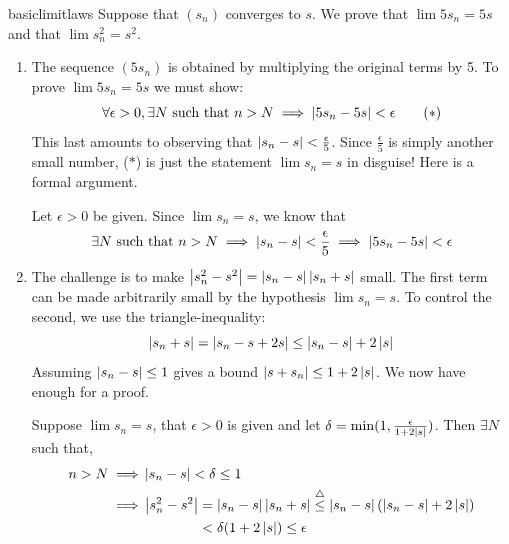 \begin{examples}{}{basiclimitlaws}
	Suppose that $(s_n)$ converges to $s$. We prove that $\lim 5s_n=5s$ and that $\lim s_n^2=s^2$.
	\begin{enumerate}
	  \item\label{ex:basiclimitlaws1} The sequence $(5s_n)$ is obtained by multiplying the original terms by 5. To prove $\lim 5s_n=5s$ we must show:
		\[
			\forall\epsilon>0, \exists N\text{ such that }n>N\implies \left| 5s_n-5s\right|<\epsilon\tag{$\ast$}
		\]
		This last amounts to observing that $\left| s_n-s\right|<\frac\epsilon 5$. Since $\frac\epsilon 5$ is simply another small number, ($\ast$) is just the statement $\lim s_n=s$ in disguise! Here is a formal argument.\par
		Let $\epsilon>0$ be given. Since $\lim s_n=s$, we know that\footnotemark
		\[
			\exists N\text{ such that }n>N\implies \left| s_n-s\right|<\smash{\frac\epsilon 5}\implies \left| 5s_n-5s\right|<\epsilon 
		\]
		\item\label{ex:basiclimitlaws2} The challenge is to make $\left| s_n^2-s^2\right|=\left| s_n-s\right|\left| s_n+s\right|$ small. The first term can be made arbitrarily small by the hypothesis $\lim s_n=s$. To control the second, we use the triangle-inequality:
		\[
			\left| s_n+s\right|=\left| s_n-s+2s\right|\le\left| s_n-s\right|+2\left| s\right|
		\]
		Assuming $\left| s_n-s\right|\le 1$ gives a bound $\left| s+s_n\right|\le 1+2\left| s\right|$. We now  have enough for a proof.\par
		Suppose $\lim s_n=s$, that $\epsilon>0$ is given and let $\delta=\min(1,\frac\epsilon{1+2\left| s\right|})$. Then $\exists N$ such that,
		\begin{align*}
			n>N\implies &\nm{s_n-s}<\delta\le 1\\
			\implies &\nm{s_n^2-s^2}=\nm{s_n-s}\nm{s_n+s} \overset{\triangle}{\le}
			\nm{s_n-s}\left(\nm{s_n-s}+2\nm s\right)\\
			&\phantom{\nm{s_n^2-s^2}\,}<\delta(1+2\nm s)\le\epsilon
		\end{align*}
	\end{enumerate}
\end{examples}



